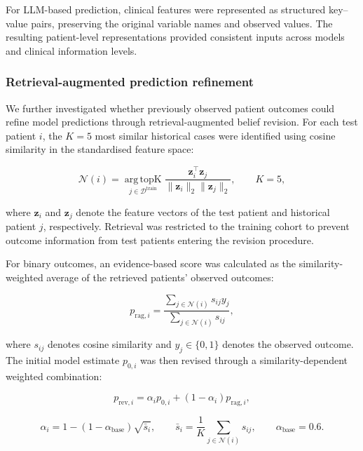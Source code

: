 \documentclass[pdflatex,sn-nature]{sn-jnl}
\begin{document}
For LLM-based prediction, clinical features were represented as structured key--value pairs, preserving the original variable names and observed values. The resulting patient-level representations provided consistent inputs across models and clinical information levels.


\iffalse
\subsubsection{Retrieval-augmented prediction refinement}
\label{sec:rag_methods}

We further investigated whether previously observed patient outcomes could refine model predictions through retrieval-augmented belief revision. For each test patient $i$, the $K=5$ most similar historical cases were identified using cosine similarity in the standardised feature space:

\begin{equation}
\mathcal{N}(i)=
\underset{j\in\mathcal{D}^{\mathrm{train}}}
{\operatorname{arg\,topK}}
\frac{\mathbf{z}_i^\top\mathbf{z}_j}
{\|\mathbf{z}_i\|_2\|\mathbf{z}_j\|_2},
\qquad K=5,
\label{eq:rag}
\end{equation}

where $\mathbf{z}_i$ and $\mathbf{z}_j$ denote the feature vectors of the test patient and historical patient $j$, respectively. Retrieval was restricted to the training cohort to prevent outcome information from test patients entering the revision procedure.

For binary outcomes, an evidence-based score was calculated as the similarity-weighted average of the retrieved patients' observed outcomes:

\begin{equation}
p_{\mathrm{rag},i}
=
\frac{
\sum_{j\in\mathcal{N}(i)}s_{ij}y_j
}{
\sum_{j\in\mathcal{N}(i)}s_{ij}
},
\label{eq:prag}
\end{equation}

where $s_{ij}$ denotes cosine similarity and $y_j\in\{0,1\}$ denotes the observed outcome. The initial model estimate $p_{0,i}$ was then revised through a similarity-dependent weighted combination:

\begin{equation}
p_{\mathrm{rev},i}
=
\alpha_i p_{0,i}
+
(1-\alpha_i)p_{\mathrm{rag},i},
\label{eq:prev}
\end{equation}

\begin{equation}
\alpha_i
=
1-(1-\alpha_{\mathrm{base}})
\sqrt{\bar{s}_i},
\qquad
\bar{s}_i=
\frac{1}{K}
\sum_{j\in\mathcal{N}(i)}s_{ij},
\qquad
\alpha_{\mathrm{base}}=0.6.
\label{eq:alpha}
\end{equation}
\end{document}
